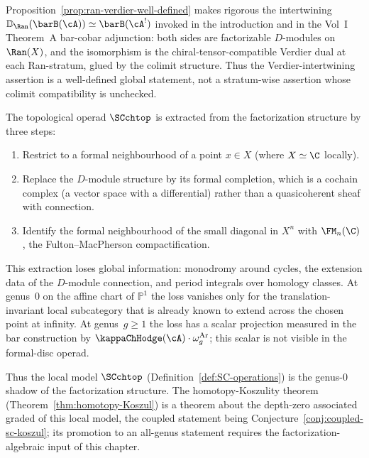 \begin{remark}
\label{rem:ran-verdier-thmA}
Proposition~\ref{prop:ran-verdier-well-defined} makes rigorous the
intertwining $\bD_{\Ran}(\barB(\cA)) \simeq \barB(\cA^!)$ invoked in the
introduction and in the Vol~I Theorem~A bar-cobar adjunction: both
sides are factorizable $D$-modules on $\Ran(X)$, and the isomorphism is
the chiral-tensor-compatible Verdier dual at each Ran-stratum, glued by
the colimit structure. Thus the Verdier-intertwining assertion is a
well-defined global statement, not a stratum-wise assertion whose
colimit compatibility is unchecked.
\end{remark}

\begin{remark}
\label{rem:local-shadow-extraction}
The topological operad $\SCchtop$ is extracted from the factorization
structure by three steps:
\begin{enumerate}[label=\textup{(\arabic*)}]
\item Restrict to a formal neighbourhood of a point $x \in X$
 (where $X \simeq \C$ locally).
\item Replace the $D$-module structure by its formal completion, which
 is a cochain complex (a vector space with a differential) rather
 than a quasicoherent sheaf with connection.
\item Identify the formal neighbourhood of the small diagonal in
 $X^n$ with $\FM_n(\C)$, the Fulton--MacPherson compactification.
\end{enumerate}
This extraction loses global information: monodromy around cycles,
the extension data of the $D$-module connection, and period integrals
over homology classes. At genus~$0$ on the affine chart of
$\mathbb{P}^1$ the loss vanishes only for the translation-invariant
local subcategory that is already known to extend across the chosen
point at infinity. At genus~$g \geq 1$ the loss has a scalar
projection measured in the bar construction by
$\kappaChHodge(\cA)\cdot\omega_g^{\mathrm{Ar}}$; this scalar is not visible in the
formal-disc operad.

Thus the local model $\SCchtop$
(Definition~\ref{def:SC-operations}) is the genus-$0$ shadow of
the factorization structure. The homotopy-Koszulity theorem
(Theorem~\ref{thm:homotopy-Koszul}) is a theorem about the
depth-zero associated graded of this local model, the coupled
statement being Conjecture~\ref{conj:coupled-sc-koszul}; its
promotion to an all-genus statement requires the
factorization-algebraic input of this chapter.
\end{remark}


